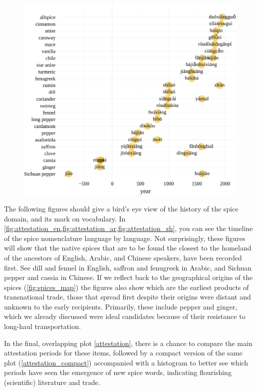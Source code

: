 \begin{figure}[!ht]
  \centering
  \includegraphics[width=\linewidth]{imgs/plots/attestation_zh.pdf}
  \caption{}
  \label{fig:attestation_zh}
\end{figure}

The following figures should give a bird's eye view of the history of the spice domain, and its mark on vocabulary. In \cref{fig:attestation_en,fig:attestation_ar,fig:attestation_zh}, you can see the timeline of the spice nomenclature language by language. Not surprisingly, these figures will show that the native spices that are to be found the closest to the homeland of the ancestors of English, Arabic, and Chinese speakers, have been recorded first. See dill and fennel in English, saffron and fenugreek in Arabic, and Sichuan pepper and cassia in Chinese. If we reflect back to the geographical origins of the spices (\cref{fig:spices_map}) the figures also show which are the earliest products of transnational trade, those that spread first despite their origins were distant and unknown to the early recipients. Primarily, these include pepper and ginger, which we already discussed were ideal candidates because of their resistance to long-haul transportation. 

In the final, overlapping plot \cref{attestation}, there is a chance to compare the main attestation periods for these items, followed by a compact version of the same plot (\cref{attestation_compact}) accompanied with a histogram to better see which periods have seen the emergence of new spice words, indicating flourishing (scientific) literature and trade. 

